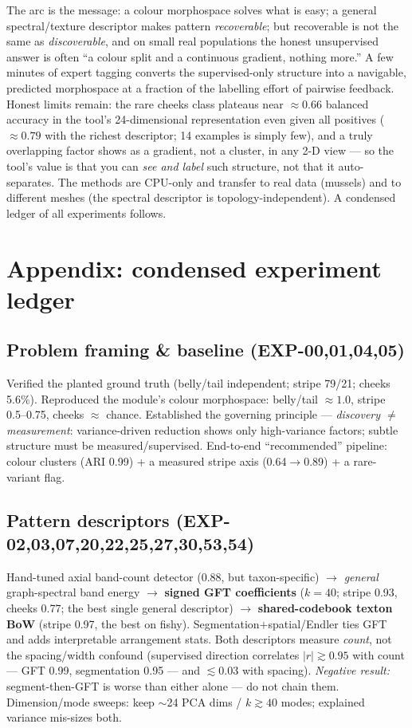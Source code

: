 \documentclass[11pt]{article}
\begin{document}
The arc is the message: a colour morphospace solves what is easy; a general spectral/texture descriptor makes
pattern \emph{recoverable}; but recoverable is not the same as \emph{discoverable}, and on small real
populations the honest unsupervised answer is often ``a colour split and a continuous gradient, nothing more.''
A few minutes of expert tagging converts the supervised-only structure into a navigable, predicted morphospace
at a fraction of the labelling effort of pairwise feedback. Honest limits remain: the rare cheeks class plateaus
near $\approx\!0.66$ balanced accuracy in the tool's 24-dimensional representation even given all positives
($\approx\!0.79$ with the richest descriptor; 14 examples is simply few), and a truly
overlapping factor shows as a gradient, not a cluster, in any 2-D view --- so the tool's value is that you can
\emph{see and label} such structure, not that it auto-separates. The methods are CPU-only and transfer to real
data (mussels) and to different meshes (the spectral descriptor is topology-independent). A condensed ledger of
all experiments follows.

\appendix
\section*{Appendix: condensed experiment ledger}
\renewcommand{\thesubsection}{\Alph{subsection}}

\small

\subsection{Problem framing \& baseline (EXP-00,01,04,05)}
Verified the planted ground truth (belly/tail independent; stripe 79/21; cheeks 5.6\%). Reproduced the module's
colour morphospace: belly/tail $\approx\!1.0$, stripe 0.5--0.75, cheeks $\approx$ chance. Established the
governing principle --- \emph{discovery $\neq$ measurement}: variance-driven reduction shows only high-variance
factors; subtle structure must be measured/supervised. End-to-end ``recommended'' pipeline: colour clusters
(ARI 0.99) + a measured stripe axis (0.64$\rightarrow$0.89) + a rare-variant flag.

\subsection{Pattern descriptors (EXP-02,03,07,20,22,25,27,30,53,54)}
Hand-tuned axial band-count detector (0.88, but taxon-specific) $\rightarrow$ \emph{general} graph-spectral
band energy $\rightarrow$ \textbf{signed GFT coefficients} ($k{=}40$; stripe 0.93, cheeks 0.77; the best single
general descriptor) $\rightarrow$ \textbf{shared-codebook texton BoW} (stripe 0.97, the best on fishy).
Segmentation$+$spatial/Endler ties GFT and adds interpretable arrangement stats. Both descriptors measure
\emph{count}, not the spacing/width confound (supervised direction correlates $|r|\gtrsim 0.95$ with count
--- GFT 0.99, segmentation 0.95 --- and $\lesssim 0.03$ with spacing). \emph{Negative result:} segment-then-GFT is worse than either alone --- do not chain them.
Dimension/mode sweeps: keep $\sim$24 PCA dims / $k\!\gtrsim\!40$ modes; explained variance mis-sizes both.
\end{document}
